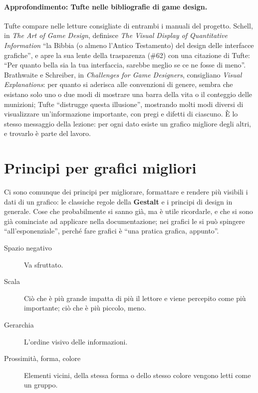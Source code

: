 \paragraph{Approfondimento: Tufte nelle bibliografie di game design.} Tufte
compare nelle letture consigliate di entrambi i manuali del progetto.
Schell, in \emph{The Art of Game Design}, definisce \emph{The Visual Display of
Quantitative Information} ``la Bibbia (o almeno l'Antico Testamento) del
design delle interfacce grafiche'', e apre la sua lente della trasparenza
(\#62) con una citazione di Tufte: ``Per quanto bella sia la tua
interfaccia, sarebbe meglio se ce ne fosse di meno''. Brathwaite e Schreiber,
in \emph{Challenges for Game Designers}, consigliano \emph{Visual
Explanations}: per quanto si aderisca alle convenzioni di genere, sembra che
esistano solo uno o due modi di mostrare una barra della vita o il conteggio
delle munizioni; Tufte ``distrugge questa illusione'', mostrando molti modi
diversi di visualizzare un'informazione importante, con pregi e difetti di
ciascuno. È lo stesso messaggio della lezione: per ogni dato esiste un
grafico migliore degli altri, e trovarlo è parte del lavoro.

\section{Principi per grafici migliori}
\label{sec:principi-grafici}



Ci sono comunque dei principi per migliorare, formattare e rendere più
visibili i dati di un grafico: le classiche regole della \textbf{Gestalt} e i
principi di design in generale. Cose che probabilmente si sanno già, ma è utile
ricordarle, e che si sono già cominciate ad applicare nella documentazione;
nei grafici le si può spingere ``all'esponenziale'', perché fare grafici è
``una pratica grafica, appunto''.
\begin{description}
  \item[Spazio negativo] Va sfruttato.
  \item[Scala] Ciò che è più grande impatta di più il lettore e viene
        percepito come più importante; ciò che è più piccolo, meno.
  \item[Gerarchia] L'ordine visivo delle informazioni.
  \item[Prossimità, forma, colore] Elementi vicini, della stessa forma o
        dello stesso colore vengono letti come un gruppo.
\end{description}

